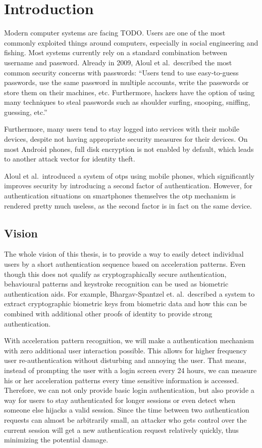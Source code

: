 \chapter{Introduction}\label{chapter:introduction}
Modern computer systems are facing TODO. Users are one of the most commonly exploited things around computers, especially in social engineering and fishing. Most systems currently rely on a standard combination between username and password. Already in 2009, Aloul et al.\ described the most common security concerns with passwords:\cite{aloul2009two}
``Users tend to use easy-to-guess passwords, use the same password in multiple accounts, write the passwords or store them on their machines, etc. Furthermore, hackers have the option of using many techniques to steal passwords such as shoulder surfing, snooping, sniffing, guessing, etc.''

Furthermore, many users tend to stay logged into services with their mobile devices, despite not having appropriate security measures for their devices. On most Android phones, full disk encryption is not enabled by default, which leads to another attack vector for identity theft.

Aloul et al.\ introduced a system of \glspl{otp} using mobile phones, which significantly improves security by introducing a second factor of authentication. However, for authentication situations on smartphones themselves the \gls{otp} mechanism is rendered pretty much useless, as the second factor is in fact on the same device.

\cite{bishop2006pattern}
\section{Vision}
The whole vision of this thesis, is to provide a way to easily detect individual users by a short authentication sequence based on acceleration patterns. Even though this does not qualify as cryptographically secure authentication, behavioural patterns and keystroke recognition can be used as biometric authentication aids. For example, Bhargav-Spantzel et. al.\cite{bhargav2006privacy}\ described a system to extract cryptographic biometric keys from biometric data and how this can be combined with additional other proofs of identity to provide strong authentication.

With acceleration pattern recognition, we will make a authentication mechanism with zero additional user interaction possible. This allows for higher frequency user re-authentication without disturbing and annoying the user. That means, instead of prompting the user with a login screen every 24 hours, we can measure his or her acceleration patterns every time sensitive information is accessed. Therefore, we can not only provide basic login authentication, but also provide a way for users to stay authenticated for longer sessions or even detect when someone else hijacks a valid session. Since the time between two authentication requests can almost be arbitrarily small, an attacker who gets control over the current session will get a new authentication request relatively quickly, thus minimizing the potential damage.
